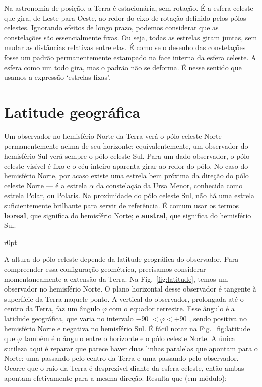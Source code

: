 Na astronomia de posição, a Terra é estacionária, sem rotação. É a esfera celeste que gira, de Leste para Oeste, ao redor do eixo de rotação definido pelos pólos celestes. Ignorando efeitos de longo prazo, podemos considerar que as constelações são essencialmente fixas. Ou seja, todas as estrelas giram juntas, sem mudar as distâncias relativas entre elas. É como se o desenho das constelações fosse um padrão permanentemente estampado na face interna da esfera celeste. A esfera como um todo gira, mas o padrão não se deforma. É nesse sentido que usamos a expressão `estrelas fixas'. 

\section{Latitude geográfica}

Um observador no hemisfério Norte da Terra verá o pólo celeste Norte permanentemente acima de seu horizonte; equivalentemente, um observador do hemisfério Sul verá sempre o pólo celeste Sul. Para um dado observador, o pólo celeste visível é fixo e o céu inteiro aparenta girar ao redor do pólo. No caso do hemisfério Norte, por acaso existe uma estrela bem próxima da direção do pólo celeste Norte --- é a estrela $\alpha$ da constelação da Ursa Menor, conhecida como estrela Polar, ou Polaris. Na proximidade do pólo celeste Sul, não há uma estrela suficientemente brilhante para servir de referência. É comum usar os termos \textbf{boreal}, que significa do hemisfério Norte; e \textbf{austral}, que significa do hemisfério Sul.

\newpage

\begin{wrapfigure}{r}{0pt}

\caption{Latitude geográfica.}
\label{fig:latitude}
\end{wrapfigure}

A altura do pólo celeste depende da latitude geográfica do observador. Para compreender essa configuração geométrica, precisamos considerar momentaneamente a extensão da Terra. Na Fig.~\ref{fig:latitude}, temos um observador no hemisfério Norte. O plano horizontal desse observador é tangente à superfície da Terra naquele ponto. A vertical do observador, prolongada até o centro da Terra, faz um ângulo $\varphi$ com o equador terrestre. Esse ângulo é a latidude geográfica, que varia no intervalo $-90^{\circ} < \varphi < +90^{\circ}$, sendo positiva no hemisfério Norte e negativa no hemisfério Sul. É fácil notar na Fig.~\ref{fig:latitude} que $\varphi$ também é o ângulo entre o horizonte e o pólo celeste Norte. A única sutileza aqui é reparar que parece haver duas linhas paralelas que apontam para o Norte: uma passando pelo centro da Terra e uma passando pelo observador. Ocorre que o raio da Terra é desprezível diante da esfera celeste, então ambas apontam efetivamente para a mesma direção. Resulta que (em módulo):

